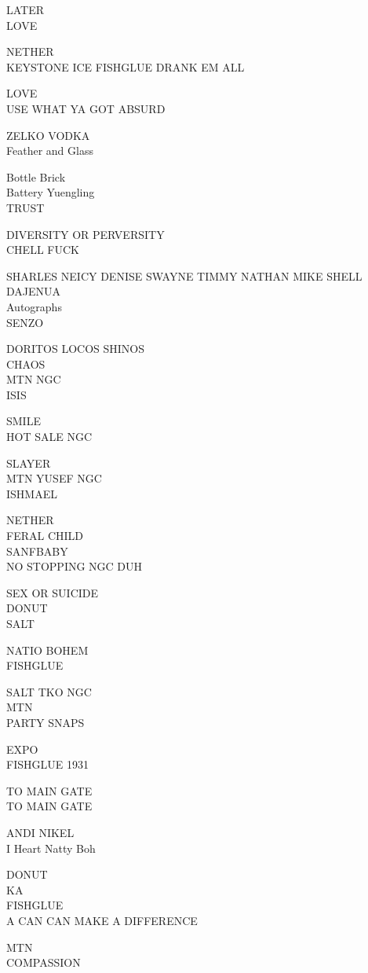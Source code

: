 \documentclass[10pt,letterpaper]{article}
\begin{document}
LATER\\
LOVE

NETHER\\
KEYSTONE ICE FISHGLUE DRANK EM ALL

LOVE\\
USE WHAT YA GOT ABSURD

ZELKO VODKA\\
Feather and Glass

Bottle Brick\\
Battery Yuengling\\
TRUST

DIVERSITY OR PERVERSITY\\
CHELL FUCK

SHARLES NEICY DENISE SWAYNE TIMMY NATHAN MIKE SHELL DAJENUA\\
Autographs\\
SENZO

DORITOS LOCOS SHINOS\\
CHAOS\\
MTN NGC\\
ISIS

SMILE\\
HOT SALE NGC

SLAYER\\
MTN YUSEF NGC\\
ISHMAEL

NETHER\\
FERAL CHILD\\
SANFBABY\\
NO STOPPING NGC DUH

SEX OR SUICIDE\\
DONUT\\
SALT

NATIO BOHEM\\
FISHGLUE

SALT TKO NGC\\
MTN\\
PARTY SNAPS

EXPO\\
FISHGLUE 1931

TO MAIN GATE\\
TO MAIN GATE

ANDI NIKEL\\
I Heart Natty Boh

DONUT\\
KA\\
FISHGLUE\\
A CAN CAN MAKE A DIFFERENCE

MTN\\
COMPASSION
\end{document}
